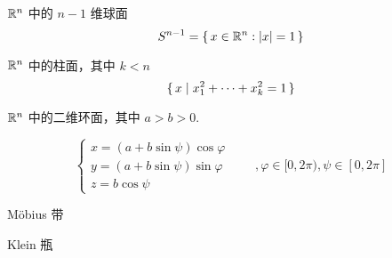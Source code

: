 \begin{example}
$\mathbb{R}^n$ 中的 $n-1$ 维球面
$$
S^{n-1}=\set{x\in\mathbb{R}^n:\lvert{x}\rvert=1}
$$
\end{example}

\begin{example}
$\mathbb{R}^n$ 中的柱面，其中 $k<n$
$$
\set{x|x_1^2+\cdots+x_k^2=1}
$$
\end{example}

\begin{example}
$\mathbb{R}^n$ 中的二维环面，其中 $a>b>0$.


$$
\begin{cases}
x=(a+b\sin\psi)\cos\varphi\\
y=(a+b\sin\psi)\sin\varphi\\
z=b\cos\psi
\end{cases}\qquad,\varphi\in[0,2\pi),\psi\in[0,2\pi]
$$
\end{example}

\begin{example}
Möbius 带

\end{example}

\begin{example}
Klein 瓶

\end{example}